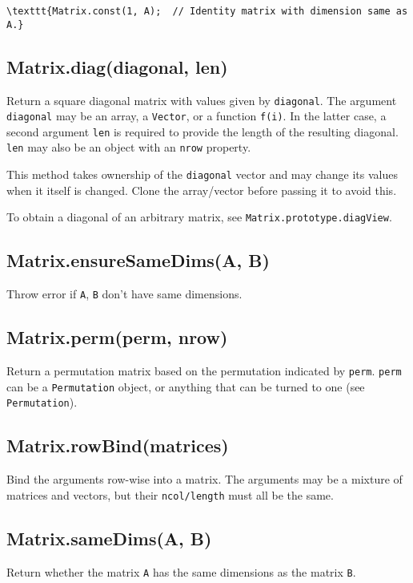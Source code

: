 \documentclass{article}
\begin{document}
\begin{lstlisting}
\texttt{Matrix.const(1, A);  // Identity matrix with dimension same as A.}\end{lstlisting}

    \subsection*{Matrix.diag(diagonal, len)}
    Return a square diagonal matrix with values given by \texttt{diagonal}. The argument
\texttt{diagonal} may be an array, a \texttt{Vector}, or a function \texttt{f(i)}. In the latter case,
a second argument \texttt{len} is required to provide the length of the resulting diagonal.
\texttt{len} may also be an object with an \texttt{nrow} property.


This method takes ownership of the \texttt{diagonal} vector and may
change its values when it itself is changed. Clone the
array/vector before passing it to avoid this.


To obtain a diagonal of an arbitrary matrix, see \texttt{Matrix.prototype.diagView}.


    \subsection*{Matrix.ensureSameDims(A, B)}
    Throw error if \texttt{A}, \texttt{B} don't have same dimensions.


    \subsection*{Matrix.perm(perm, nrow)}
    Return a permutation matrix based on the permutation indicated by \texttt{perm}. \texttt{perm} can be
a \texttt{Permutation} object, or anything that can be turned to one (see \texttt{Permutation}).


    \subsection*{Matrix.rowBind(matrices)}
    Bind the arguments row-wise into a matrix. The arguments may be a
mixture of matrices and vectors, but their \texttt{ncol/length} must all be the same.


    \subsection*{Matrix.sameDims(A, B)}
    Return whether the matrix \texttt{A} has the same dimensions as the matrix \texttt{B}.
\end{document}
